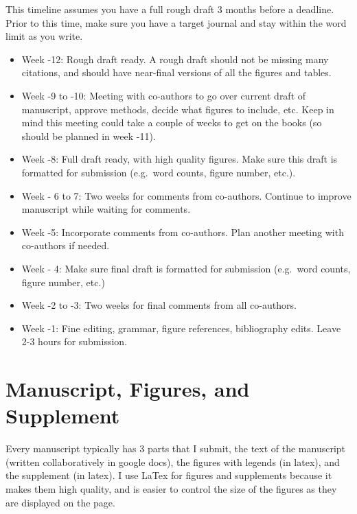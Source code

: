 \documentclass[
  letterpaper,
  DIV=11,
  numbers=noendperiod]{scrreprt}
\begin{document}

This timeline assumes you have a full rough draft 3 months before a
deadline. Prior to this time, make sure you have a target journal and
stay within the word limit as you write.

\begin{itemize}
\item
  Week -12: Rough draft ready. A rough draft should not be missing many
  citations, and should have near-final versions of all the figures and
  tables.
\item
  Week -9 to -10: Meeting with co-authors to go over current draft of
  manuscript, approve methods, decide what figures to include, etc. Keep
  in mind this meeting could take a couple of weeks to get on the books
  (so should be planned in week -11).
\item
  Week -8: Full draft ready, with high quality figures. Make sure this
  draft is formatted for submission (e.g.~word counts, figure number,
  etc.).
\item
  Week - 6 to 7: Two weeks for comments from co-authors. Continue to
  improve manuscript while waiting for comments.
\item
  Week -5: Incorporate comments from co-authors. Plan another meeting
  with co-authors if needed.
\item
  Week - 4: Make sure final draft is formatted for submission (e.g.~word
  counts, figure number, etc.)
\item
  Week -2 to -3: Two weeks for final comments from all co-authors.
\item
  Week -1: Fine editing, grammar, figure references, bibliography edits.
  Leave 2-3 hours for submission.
\end{itemize}

\hypertarget{manuscript-figures-and-supplement}{%
\section*{\texorpdfstring{\textbf{Manuscript, Figures, and
Supplement}}{Manuscript, Figures, and Supplement}}\label{manuscript-figures-and-supplement}}


Every manuscript typically has 3 parts that I submit, the text of the
manuscript (written collaboratively in google docs), the figures with
legends (in latex), and the supplement (in latex). I use LaTex for
figures and supplements because it makes them high quality, and is
easier to control the size of the figures as they are displayed on the
page.
\end{document}
